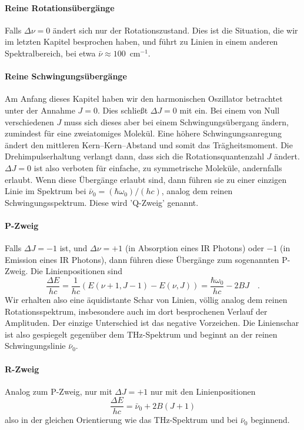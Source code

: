\paragraph{Reine Rotationsübergänge} Falls $\Delta \nu = 0$ ändert sich nur der Rotationszustand. Dies ist die Situation, die wir im letzten Kapitel besprochen haben, und führt zu Linien  in einem anderen Spektralbereich, bei etwa $\bar{\nu} \approx 100$~cm$^{-1}$.

\paragraph{Reine Schwingungsübergänge} Am Anfang dieses Kapitel haben wir den  harmonischen Oszillator betrachtet unter der Annahme $J=0$. Dies schließt $\Delta J = 0$ mit ein. Bei einem von Null verschiedenen $J$ muss sich dieses aber bei einem Schwingungsübergang ändern, zumindest für eine zweiatomiges Molekül. Eine höhere Schwingungsanregung ändert den mittleren Kern--Kern--Abstand und somit das Trägheitsmoment. Die Drehimpulserhaltung verlangt dann, dass sich die Rotationsquantenzahl $J$ ändert. $\Delta J = 0$ ist also verboten für einfache, zu symmetrische Moleküle, andernfalls erlaubt. Wenn diese Übergänge erlaubt sind, dann führen sie zu einer einzigen Linie im Spektrum bei $ \bar{\nu}_0 = (\hbar \omega_0)/(h c) $, analog dem reinen Schwingungsspektrum. Diese wird 'Q-Zweig' genannt. 

\paragraph{P-Zweig} Falls $\Delta J = -1$ ist, und $\Delta \nu = +1$ (in Absorption eines IR Photons) oder $-1$ (in Emission eines IR Photons), dann führen diese Übergänge zum sogenannten P-Zweig. Die Linienpositionen sind
\begin{equation}
 \frac{\Delta E}{h c} = \frac{1}{h c} \left( E(\nu +1, J -1) - E(\nu, J) \right) = \frac{\hbar \omega_0}{h c}   - 2 B J \quad .
\end{equation}
Wir erhalten also eine äquidistante Schar von Linien, völlig analog dem reinen Rotationsspektrum, insbesondere auch im dort besprochenen Verlauf der Amplituden. Der einzige Unterschied ist das negative Vorzeichen. Die Linienschar ist also gespiegelt gegenüber dem THz-Spektrum und beginnt an der reinen Schwingungslinie $\bar{\nu}_0 $.

\paragraph{R-Zweig} Analog zum P-Zweig, nur mit  $\Delta J = +1$ nur mit den Linienpositionen
\begin{equation}
 \frac{\Delta E}{h c} =  \bar{\nu}_0   + 2 B ( J +1)
\end{equation}
also in der gleichen Orientierung wie das THz-Spektrum und bei $\bar{\nu}_0 $ beginnend.


